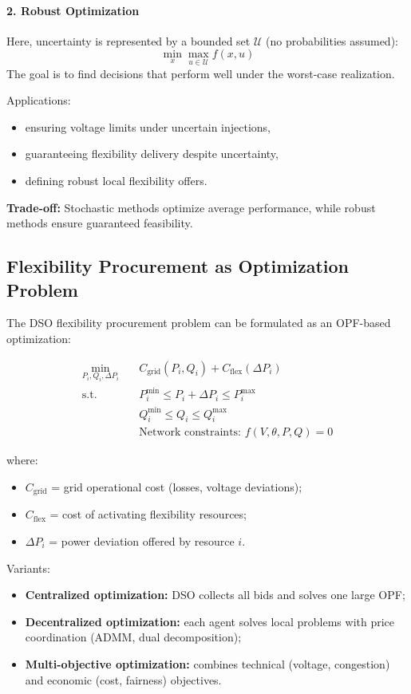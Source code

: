 \documentclass[11pt]{article}
\begin{document}
	\paragraph{2. Robust Optimization}
	Here, uncertainty is represented by a bounded set $\mathcal{U}$ (no probabilities assumed):
	\[
	\min_{x} \max_{u \in \mathcal{U}} f(x, u)
	\]
	The goal is to find decisions that perform well under the worst-case realization.
	
	Applications:
	\begin{itemize}
		\item ensuring voltage limits under uncertain injections,
		\item guaranteeing flexibility delivery despite uncertainty,
		\item defining robust local flexibility offers.
	\end{itemize}
	
	\textbf{Trade-off:}  
	Stochastic methods optimize average performance, while robust methods ensure guaranteed feasibility.
	
	\subsection{Flexibility Procurement as Optimization Problem}
	
	The DSO flexibility procurement problem can be formulated as an OPF-based optimization:
	
	\[
	\begin{aligned}
		\min_{P_i, Q_i, \Delta P_i} \quad & C_\text{grid}(P_i, Q_i) + C_\text{flex}(\Delta P_i) \\
		\text{s.t.} \quad & P_i^{\min} \le P_i + \Delta P_i \le P_i^{\max} \\
		& Q_i^{\min} \le Q_i \le Q_i^{\max} \\
		& \text{Network constraints: } f(V, \theta, P, Q) = 0
	\end{aligned}
	\]
	
	where:
	\begin{itemize}
		\item $C_\text{grid}$ = grid operational cost (losses, voltage deviations);
		\item $C_\text{flex}$ = cost of activating flexibility resources;
		\item $\Delta P_i$ = power deviation offered by resource $i$.
	\end{itemize}
	
	Variants:
	\begin{itemize}
		\item \textbf{Centralized optimization:} DSO collects all bids and solves one large OPF;
		\item \textbf{Decentralized optimization:} each agent solves local problems with price coordination (ADMM, dual decomposition);
		\item \textbf{Multi-objective optimization:} combines technical (voltage, congestion) and economic (cost, fairness) objectives.
	\end{itemize}
	
\end{document}
